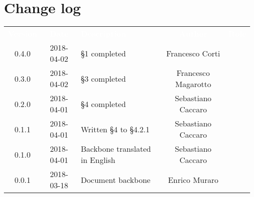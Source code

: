 \section*{Change log}
{
	\renewcommand{\arraystretch}{1.5}
	\centering
	\begin{longtable}{ c c C{6cm} c c }
		\textcolor{white}{\textbf{Version}} & \textcolor{white}{\textbf{Date}} & \textcolor{white}{\textbf{Description}} & \textcolor{white}{\textbf{Author}} & \textcolor{white}{\textbf{Role}}\\
		
		0.4.0 & 2018-04-02 & §1 completed  & Francesco Corti & \reda{}\\				
		
		0.3.0 & 2018-04-02 & §3 completed  & Francesco Magarotto & \reda{}\\		
		
		0.2.0 & 2018-04-01 & §4 completed  & Sebastiano Caccaro & \reda{}\\
		0.1.1 & 2018-04-01 & Written §4 to §4.2.1  & Sebastiano Caccaro & \reda{}\\
		0.1.0 & 2018-04-01 & Backbone translated in English & Sebastiano Caccaro & \reda{}\\
		0.0.1 & 2018-03-18 & Document backbone & Enrico Muraro & \reda{}\\
		
	\end{longtable}

}